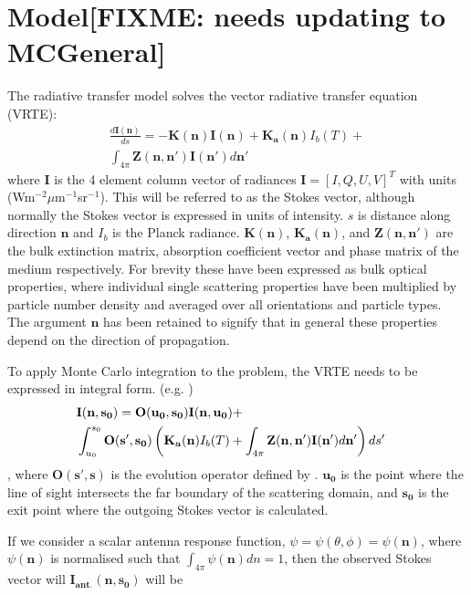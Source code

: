 \section{Model[FIXME: needs updating to MCGeneral]}
 \label{sec:montecarlo:model}
The radiative transfer model solves the vector
radiative transfer equation (VRTE):
\begin{eqnarray}
\frac{d\mathbf{I(n)}}{ds}=-\mathbf{K(n)I(n)} +
\mathbf{K_a(n)}I_b(T) +\nonumber\\
\int_{4\pi}\mathbf{Z(n,n')I(n')}d\mathbf{n'}
\label{vrte}
\end{eqnarray}
where $\mathbf{I}$ is the 4 element column vector of radiances
$\mathbf{I}=\left[I,Q,U,V\right]^T$ with units
(Wm$^{-2}\mu$m$^{-1}$sr$^{-1}$). This will be referred to as the
Stokes vector, although normally the Stokes vector is expressed in
units of intensity.  $s$ is distance along direction $\mathbf{n}$ and
$I_b$ is the Planck radiance. $\mathbf{K(n)}$, $\mathbf{K_a(n)}$,
and $\mathbf{Z(n,n')}$ are the bulk extinction matrix, absorption
coefficient vector and phase matrix of the medium respectively.  For
 brevity these have been expressed as bulk optical
properties, where individual single scattering properties have been
multiplied by particle number density and averaged over all
orientations and particle types. The argument $\mathbf{n}$ has been
retained to signify that in general these properties depend on the
direction of propagation. 

To apply Monte Carlo integration to the problem, the VRTE needs to be expressed in integral form. (e.g. \cite{hochstadt:64})
\begin{eqnarray}
\lefteqn{\mathbf{I(n,s_0)}=\mathbf{O(u_0,s_0)I(n,u_0)}+}\nonumber\\
& \int_{u_0}^{s_0}\mathbf{O(s',s_0)}\left(\mathbf{K_a(n)}I_b(T) +\int_{4\pi}\mathbf{Z(n,n')}\mathbf{I(n')}d\mathbf{n'}\right)ds'\nonumber
\end{eqnarray}
\begin{equation}
\label{intVRTE}
\end{equation}
, where $\mathbf{O(s',s)}$ is the evolution operator defined by
\cite{landi:85}. $\mathbf{u_0}$ is the point where the line of sight intersects
the far boundary of the scattering domain, and $\mathbf{s_0}$ is the
exit point where the outgoing Stokes vector is calculated.

If we consider a scalar antenna response function,
$\psi=\psi(\theta,\phi)=\psi(\mathbf{n})$, where $\psi(\mathbf{n})$ is
normalised such that $\int_{4\pi}\psi(\mathbf{n})dn=1$, then the
observed Stokes vector will $\mathbf{I_{ant.}(n,s_0)}$ will be


